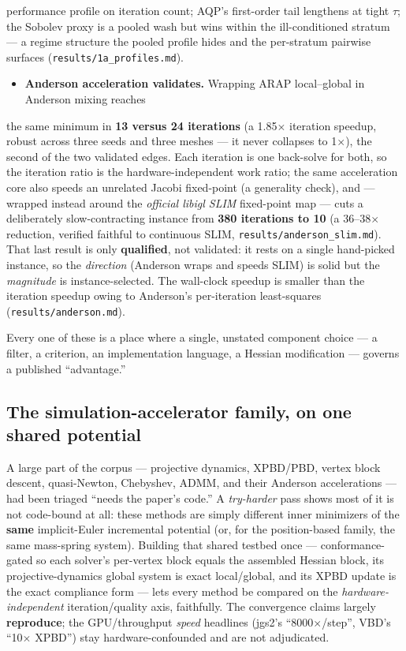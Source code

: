 \documentclass{egpubl}
\begin{document}
  performance profile on iteration count; AQP's first-order tail lengthens at tight $\tau$; the Sobolev
  proxy is a pooled wash but wins within the ill-conditioned stratum --- a regime structure the pooled
  profile hides and the per-stratum pairwise surfaces (\texttt{results/1a\_profiles.md}).
\begin{itemize}
  \item \textbf{Anderson acceleration validates.} Wrapping ARAP local--global \cite{local-global} in Anderson mixing \cite{anderson-geometry} reaches
\end{itemize}
  the same minimum in \textbf{13 versus 24 iterations} (a 1.85$\times$ iteration speedup, robust across three seeds
  and three meshes --- it never collapses to 1$\times$), the second of the two validated edges. Each iteration
  is one back-solve for both, so the iteration ratio is the hardware-independent work ratio; the same
  acceleration core also speeds an unrelated Jacobi fixed-point (a generality check), and --- wrapped
  instead around the \emph{official libigl SLIM} fixed-point map --- cuts a deliberately slow-contracting
  instance from \textbf{380 iterations to 10} (a 36--38$\times$ reduction, verified faithful to continuous SLIM,
  \texttt{results/anderson\_slim.md}). That last result is only \textbf{qualified}, not validated: it rests on a
  single hand-picked instance, so the \emph{direction} (Anderson wraps and speeds SLIM) is solid but the
  \emph{magnitude} is instance-selected. The wall-clock speedup is smaller than the iteration speedup owing
  to Anderson's per-iteration
  least-squares (\texttt{results/anderson.md}).

Every one of these is a place where a single, unstated component choice --- a filter, a criterion, an
implementation language, a Hessian modification --- governs a published ``advantage.''

\subsection{The simulation-accelerator family, on one shared potential}

A large part of the corpus --- projective dynamics, XPBD/PBD, vertex block descent, quasi-Newton,
Chebyshev, ADMM, and their Anderson accelerations --- had been triaged ``needs the paper's code.'' A
\emph{try-harder} pass shows most of it is not code-bound at all: these methods are simply different inner
minimizers of the \textbf{same} implicit-Euler incremental potential (or, for the position-based family, the
same mass-spring system). Building that shared testbed once --- conformance-gated so each solver's
per-vertex block equals the assembled Hessian block, its projective-dynamics global system is exact
local/global, and its XPBD update is the exact compliance form --- lets every method be compared on the
\emph{hardware-independent} iteration/quality axis, faithfully. The convergence claims largely \textbf{reproduce};
the GPU/throughput \emph{speed} headlines (jgs2's ``8000$\times$/step'', VBD's ``10$\times$ XPBD'') stay hardware-confounded
and are not adjudicated.
\end{document}

